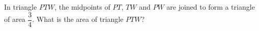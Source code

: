 In triangle $PTW$, the midpoints of $PT$, $TW$ and $PW$ are joined to form a triangle of area $\dfrac{3}{4}$. What is the area of triangle $PTW$?
